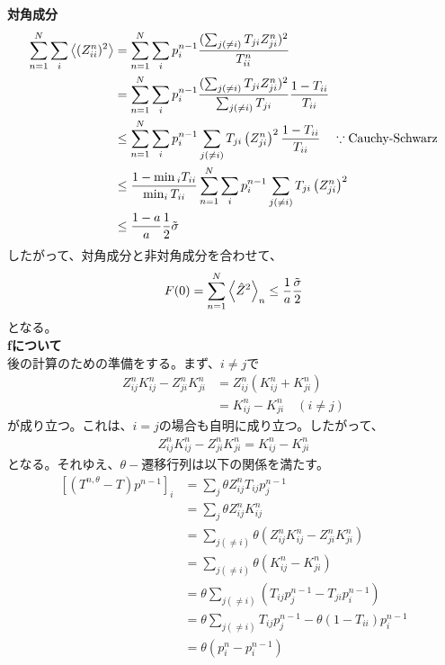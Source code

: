 \documentclass[a4paper,11pt]{jsarticle}
\numberwithin{equation}{section}
\begin{document}
\textbf{対角成分}
\begin{align}
    \sum_{n=1}^{N} \sum_{i} \ev{(Z_{ii}^n)^2} &= \sum_{n=1}^{N} \sum_{i} p_{i}^{n-1} \frac{(\sum_{j(\neq i)}T_{ji}Z_{ji}^n)^2}{T_{ii}^n} \\
    &= \sum_{n=1}^{N} \sum_{i} p_{i}^{n-1} \frac{(\sum_{j(\neq i)}T_{ji}Z_{ji}^n)^2}{\sum_{j(\neq i)}T_{ji}}\frac{1-T_{ii}}{T_{ii}}\\
    &\leq \sum_{n=1}^{N} \sum_{i} p_i^{n-1} \sum_{j (\neq i)} T_{ji} \left(Z_{ji}^n\right)^2 \frac{1 - T_{ii}}{T_{ii}} \quad \because \text{Cauchy-Schwarz}\\
    &\leq \frac{1 - \min{_i} T_{ii}}{\min_{i} T_{ii}} \sum_{n=1}^{N} \sum_{i} p_i^{n-1} \sum_{j (\neq i)} T_{ji} \left(Z_{ji}^n\right)^2 \\
    &\leq \frac{1 - a}{a} \frac{1}{2}\tilde{\sigma}
\end{align}
したがって、対角成分と非対角成分を合わせて、
\begin{align}
    F(0) = \sum_{n=1}^{N} \ev{\hat{Z}^2}_n \leq \frac{1}{a}\frac{\tilde{\sigma}}{2}
\end{align}
となる。\\
\noindent
\textbf{fについて}\\
後の計算のための準備をする。まず、$i \neq j$で
\begin{align}
    Z_{ij}^n K_{ij}^n - Z_{ji}^n K_{ji}^n &= Z_{ij}^n(K_{ij}^n + K_{ji}^n)\\
    &= K_{ij}^n - K_{ji}^n \quad (i \neq j)
\end{align}
が成り立つ。これは、$i=j$の場合も自明に成り立つ。したがって、
\begin{align}
    Z_{ij}^n K_{ij}^n - Z_{ji}^n K_{ji}^n = K_{ij}^n - K_{ji}^n
\end{align}
となる。それゆえ、$\theta-$遷移行列は以下の関係を満たす。
\begin{align}
    \left[\left(T^{n,\theta} - T\right)p^{n-1}\right]_i 
    &= \sum_{j} \theta Z_{ij}^n T_{ij} p_j^{n-1} \\
    &= \sum_{j} \theta Z_{ij}^n K_{ij}^n \\
    &= \sum_{j (\neq i)} \theta \left(Z_{ij}^n K_{ij}^n - Z_{ji}^n K_{ji}^n\right) \\
    &= \sum_{j (\neq i)} \theta \left(K_{ij}^n - K_{ji}^n\right) \\
    &= \theta \sum_{j (\neq i)} (T_{ij}p_j^{n-1} - T_{ji}p_i^{n-1})\\
    &= \theta \sum_{j (\neq i)} T_{ij}p_j^{n-1} - \theta(1-T_{ii})p_i^{n-1}\\
    &= \theta \left(p_i^n - p_i^{n-1}\right) 
\end{align}
\end{document}
